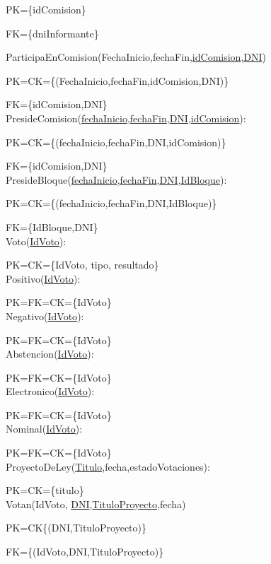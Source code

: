 PK={\{idComision}\}

FK={\{dniInformante}\}

ParticipaEnComision(FechaInicio,fechaFin,\underline{idComision},\underline{DNI})

PK=CK={\{(FechaInicio,fechaFin,idComision,DNI)}\}

FK={\{idComision,DNI}\}\\

PresideComision(\underline{fechaInicio},\underline{fechaFin},\underline{DNI},\underline{idComision}):

PK=CK={\{(fechaInicio,fechaFin,DNI,idComision)}\}

FK={\{idComision,DNI}\}\\

PresideBloque(\underline{fechaInicio},\underline{fechaFin},\underline{DNI},\underline{IdBloque}):

PK=CK={\{(fechaInicio,fechaFin,DNI,IdBloque)}\}

FK={\{IdBloque,DNI}\}\\

Voto(\underline{IdVoto}):

PK=CK={\{IdVoto, tipo, resultado}\}\\

Positivo(\underline{IdVoto}):

PK=FK=CK={\{IdVoto}\}\\

Negativo(\underline{IdVoto}):

PK=FK=CK={\{IdVoto}\}\\

Abstencion(\underline{IdVoto}):

PK=FK=CK={\{IdVoto}\}\\

Electronico(\underline{IdVoto}):

PK=FK=CK={\{IdVoto}\}\\

Nominal(\underline{IdVoto}):

PK=FK=CK={\{IdVoto}\}\\

ProyectoDeLey(\underline{Titulo},fecha,estadoVotaciones):

PK=CK={\{titulo}\}\\

Votan(IdVoto, \underline{DNI},\underline{TituloProyecto},fecha)

PK=CK{\{(DNI,TituloProyecto)}\}

FK={\{(IdVoto,DNI,TituloProyecto)}\}\\

